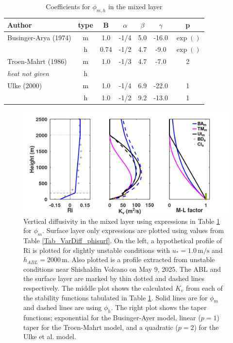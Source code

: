 \small
\begin{table}[htbp]
\begin{center}
\begin{tabular}{| l | c | c | c | c | c | c |}
\hline
Author & type & B & $\alpha$ & $\beta$ & $\gamma$ & p \\
\hline
Businger-Arya (1974) \cite{Businger1974} & m & 1.0  & -1/4 & 5.0 & -16.0 & $\exp()$ \\
                                         & h & 0.74 & -1/2 & 4.7 & -9.0 & $\exp()$ \\
\hline
Troen-Mahrt (1986)   \cite{Troen1986}    & m & 1.0 & -1/3 & 4.7 & -7.0  & 2 \\
\textit{heat not given}                  & h &     &      &     &       &   \\
\hline
Ulke (2000)          \cite{Ulke2000}     & m & 1.0 & -1/4 & 6.9 & -22.0 & 1 \\
                                         & h & 1.0 & -1/2 & 9.2 & -13.0 & 1 \\
\hline
\end{tabular}
\caption{\label{tab:VarDiff_Kz_coeffABL}Coefficients for $\phi_{m,h}$ in the mixed layer}
\end{center}
\end{table}
\normalsize

\begin{figure}[htbp]\vspace*{0cm}\hspace*{0cm}
\includegraphics[angle=0,scale=0.5]{Figures/Apx_VarDiff/Kv_ML.png}
\parbox{15cm}{\caption{\label{FigVarDiff_Kv_MixingLayer}
Vertical diffusivity in the mixed layer using expressions in Table \ref{tab:VarDiff_Kz_coeffABL} for
$\phi_m$.
Surface layer only expressions are plotted using values from Table \ref{Tab_VarDiff_phisurf}. On the left,
a hypothetical profile of $\mathrm{Ri}$ is plotted for slightly unstable conditions with $u_* = 1.0 \, \mathrm{m/s}$
and $h_{ABL} = 2000 \, \mathrm{m}$. Also plotted is a profile extracted from unstable conditions near
Shishaldin Volcano on May 9, 2025. The ABL and the surface layer are marked by thin dotted and dashed lines
respectively. The middle plot shows the calculated $K_v$ from each of the stability functions tabulated
in Table \ref{tab:VarDiff_Kz_coeffABL}. Solid lines are for $\phi_m$ and dashed lines are using $\phi_h$.
The right plot shows the taper functions; exponential for the Businger-Ayer model, linear ($p=1$) taper for
the Troen-Mahrt model, and a quadratic ($p=2$) for the Ulke et al. model.
}}
\end{figure}


